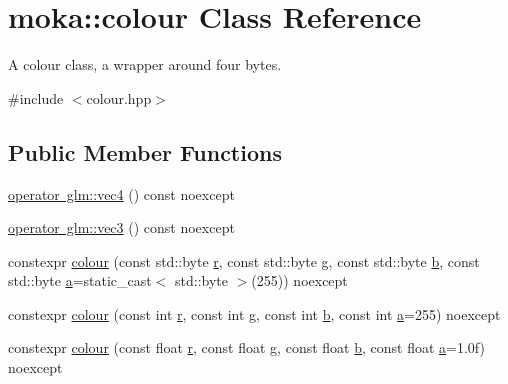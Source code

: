 \hypertarget{classmoka_1_1colour}{}\section{moka\+::colour Class Reference}
\label{classmoka_1_1colour}


A colour class, a wrapper around four bytes.  




{\ttfamily \#include $<$colour.\+hpp$>$}

\subsection*{Public Member Functions}
\begin{DoxyCompactItemize}
\item 
\mbox{\hyperlink{classmoka_1_1colour_ae61f128c67947c870a5daa830de23d67}{operator glm\+::vec4}} () const noexcept
\item 
\mbox{\hyperlink{classmoka_1_1colour_a7c6fc079f1689c2e47d698b913d16a07}{operator glm\+::vec3}} () const noexcept
\item 
constexpr \mbox{\hyperlink{classmoka_1_1colour_a69c484d6aa34beda220712e751ad99f3}{colour}} (const std\+::byte \mbox{\hyperlink{classmoka_1_1colour_a2ec71fd89ba133142c84c3a7a0ce35eb}{r}}, const std\+::byte \mbox{\hyperlink{classmoka_1_1colour_a884fe789032a1e3a1d40c55f5cf852bd}{g}}, const std\+::byte \mbox{\hyperlink{classmoka_1_1colour_a091a6fe2b9364663da19e7b561739411}{b}}, const std\+::byte \mbox{\hyperlink{classmoka_1_1colour_ac2a9d008b8201e9e2b3518f3e1d2de7e}{a}}=static\+\_\+cast$<$ std\+::byte $>$(255)) noexcept
\item 
constexpr \mbox{\hyperlink{classmoka_1_1colour_a63b2943ce195433250366a55fae7a404}{colour}} (const int \mbox{\hyperlink{classmoka_1_1colour_a2ec71fd89ba133142c84c3a7a0ce35eb}{r}}, const int \mbox{\hyperlink{classmoka_1_1colour_a884fe789032a1e3a1d40c55f5cf852bd}{g}}, const int \mbox{\hyperlink{classmoka_1_1colour_a091a6fe2b9364663da19e7b561739411}{b}}, const int \mbox{\hyperlink{classmoka_1_1colour_ac2a9d008b8201e9e2b3518f3e1d2de7e}{a}}=255) noexcept
\item 
constexpr \mbox{\hyperlink{classmoka_1_1colour_a0b699c63f210e7965fab183a3bbf74b4}{colour}} (const float \mbox{\hyperlink{classmoka_1_1colour_a2ec71fd89ba133142c84c3a7a0ce35eb}{r}}, const float \mbox{\hyperlink{classmoka_1_1colour_a884fe789032a1e3a1d40c55f5cf852bd}{g}}, const float \mbox{\hyperlink{classmoka_1_1colour_a091a6fe2b9364663da19e7b561739411}{b}}, const float \mbox{\hyperlink{classmoka_1_1colour_ac2a9d008b8201e9e2b3518f3e1d2de7e}{a}}=1.\+0f) noexcept

\end{DoxyCompactItemize}
